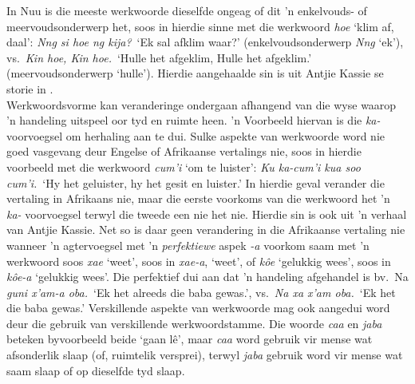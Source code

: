 In N\textipa{\textvertline}uu is die meeste werkwoorde dieselfde
ongeag of dit 'n enkelvouds- of meervoudsonderwerp het, soos in
hierdie sinne met die werkwoord
\emph{\textipa{\textdoublevertline}hoe} `klim af, daal':
\emph{N\textipa{\textvertline}ng si \textipa{\textdoublevertline}hoe
ng kija?}\ `Ek sal afklim waar?' (enkelvoudsonderwerp
\emph{N\textipa{\textvertline}ng} `ek'), vs.\ \emph{Kin
\textipa{\textdoublevertline}hoe, Kin
\textipa{\textdoublevertline}hoe.}\ `Hulle het afgeklim, Hulle het
afgeklim.' (meervoudsonderwerp `hulle'). Hierdie aangehaalde sin is
uit Antjie Kassie se storie in \textcite{Collins2011}.\\

Werkwoordsvorme kan veranderinge ondergaan afhangend van die wyse
waarop 'n handeling uitspeel oor tyd en ruimte heen. 'n Voorbeeld
hiervan is die \emph{ka-} voorvoegsel om herhaling aan te dui. Sulke
aspekte van werkwoorde word nie goed vasgevang deur Engelse of
Afrikaanse vertalings nie, soos in hierdie voorbeeld met die werkwoord
\emph{cum'i} `om te luister': \emph{Ku ka-cum'i kua soo cum'i.}\ `Hy
het geluister, hy het gesit en luister.' In hierdie geval verander die
vertaling in Afrikaans nie, maar die eerste voorkoms van die werkwoord
het 'n \emph{ka-} voorvoegsel terwyl die tweede een nie het nie.
Hierdie sin is ook uit 'n verhaal van Antjie Kassie. Net so is daar
geen verandering in die Afrikaanse vertaling nie wanneer 'n
agtervoegsel met 'n \emph{perfektiewe} aspek \emph{-a} voorkom saam
met 'n werkwoord soos \emph{\textipa{\textdoublevertline}xae} `weet',
soos in \emph{\textipa{\textdoublevertline}xae-a}, `weet', of
\emph{k\^{o}e} `gelukkig wees', soos in \emph{k\^{o}e-a} `gelukkig
wees'. Die perfektief dui aan dat 'n handeling afgehandel is bv.\ Na
\emph{g\textipa{\textvertline}uni \textipa{\textdoublevertline}x'am-a
\textipa{\textvertline}oba.}\ `Ek het alreeds die baba gewas.', vs.\
\emph{Na xa \textipa{\textdoublevertline}x'am
\textipa{\textvertline}oba.}\ `Ek het die baba gewas.' Verskillende
aspekte van werkwoorde mag ook aangedui word deur die gebruik van
verskillende werk\-woord\-stamme. Die woorde \emph{caa} en \emph{jaba}
beteken byvoorbeeld beide `gaan l\^{e}', maar \emph{caa} word gebruik
vir mense wat afsonderlik slaap (of, ruimtelik versprei), terwyl
\emph{jaba} gebruik word vir mense wat saam slaap of op dieselfde tyd
slaap.\\

